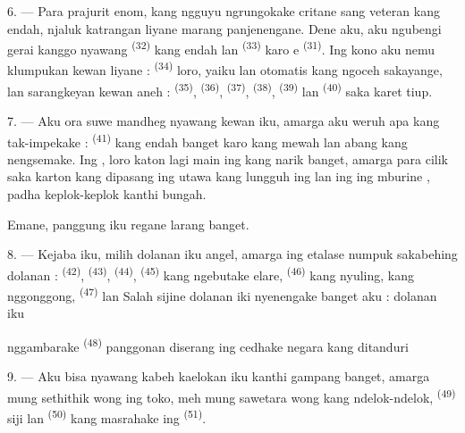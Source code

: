 6. --- Para prajurit enom, kang ngguyu ngrungokake critane sang veteran
kang endah, njaluk katrangan liyane marang panjenengane. Dene aku, aku
ngubengi gerai kanggo nyawang 
\textsuperscript{(32)} kang endah lan 
\textsuperscript{(33)} karo e \textsuperscript{(31)}. Ing
kono aku nemu klumpukan kewan liyane : 
\textsuperscript{(34)} loro, yaiku  lan
 otomatis kang ngoceh sakayange, lan sarangkeyan
kewan aneh :  \textsuperscript{(35)}, 
\textsuperscript{(36)},  \textsuperscript{(37)},
 \textsuperscript{(38)}, 
\textsuperscript{(39)} lan  \textsuperscript{(40)} saka
karet tiup.

7. --- Aku ora suwe mandheg nyawang kewan iku, amarga aku weruh apa
kang tak-impekake :  \textsuperscript{(41)} kang
endah banget karo  kang mewah lan  abang
kang nengsemake. Ing ,  loro katon lagi
main  ing  kang narik banget, amarga para
 cilik saka karton kang dipasang ing 
utawa kang lungguh ing  lan ing  ing mburine , padha keplok-keplok kanthi
bungah.

Emane, panggung iku regane larang banget.

8. --- Kejaba iku, milih dolanan iku angel, amarga ing etalase numpuk
sakabehing dolanan :  \textsuperscript{(42)},
 \textsuperscript{(43)}, 
\textsuperscript{(44)},  \textsuperscript{(45)} kang
ngebutake elare,  \textsuperscript{(46)} kang nyuling,
 kang nggonggong, 
\textsuperscript{(47)} lan  Salah sijine
dolanan iki nyenengake banget aku : dolanan iku


nggambarake  \textsuperscript{(48)} panggonan
 diserang  ing cedhake negara kang
ditanduri 

9. --- Aku bisa nyawang kabeh kaelokan iku kanthi gampang banget,
amarga mung sethithik wong ing toko, meh mung sawetara wong kang
ndelok-ndelok,  \textsuperscript{(49)} siji lan
 \textsuperscript{(50)} kang masrahake 
ing  \textsuperscript{(51)}.


